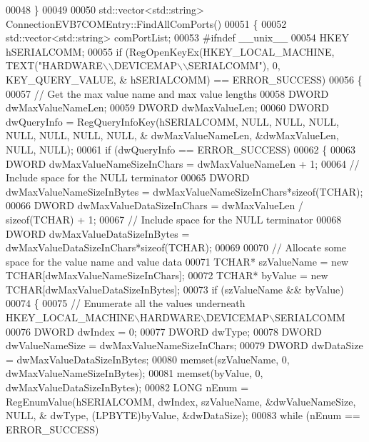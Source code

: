 \begin{DoxyCode}
00048 \}
00049 
00050 std::vector<std::string> ConnectionEVB7COMEntry::FindAllComPorts()
00051 \{
00052     std::vector<std::string> comPortList;
00053 \textcolor{preprocessor}{    #ifndef \_\_unix\_\_}
00054     HKEY hSERIALCOMM;
00055     \textcolor{keywordflow}{if} (RegOpenKeyEx(HKEY\_LOCAL\_MACHINE, TEXT(\textcolor{stringliteral}{"HARDWARE\(\backslash\)\(\backslash\)DEVICEMAP\(\backslash\)\(\backslash\)SERIALCOMM"}),   0, KEY\_QUERY\_VALUE, &
      hSERIALCOMM) == ERROR\_SUCCESS)
00056     \{
00057         \textcolor{comment}{// Get the max value name and max value lengths}
00058         DWORD dwMaxValueNameLen;
00059         DWORD dwMaxValueLen;
00060         DWORD dwQueryInfo = RegQueryInfoKey(hSERIALCOMM, NULL, NULL, NULL, NULL, NULL, NULL, NULL, &
      dwMaxValueNameLen, &dwMaxValueLen, NULL, NULL);
00061         \textcolor{keywordflow}{if} (dwQueryInfo == ERROR\_SUCCESS)
00062         \{
00063             DWORD dwMaxValueNameSizeInChars = dwMaxValueNameLen + 1;
00064             \textcolor{comment}{// Include space for the NULL terminator}
00065             DWORD dwMaxValueNameSizeInBytes = dwMaxValueNameSizeInChars*\textcolor{keyword}{sizeof}(TCHAR);
00066             DWORD dwMaxValueDataSizeInChars = dwMaxValueLen / \textcolor{keyword}{sizeof}(TCHAR) + 1;
00067             \textcolor{comment}{// Include space for the NULL terminator}
00068             DWORD dwMaxValueDataSizeInBytes = dwMaxValueDataSizeInChars*\textcolor{keyword}{sizeof}(TCHAR);
00069 
00070             \textcolor{comment}{// Allocate some space for the value name and value data}
00071             TCHAR* szValueName = \textcolor{keyword}{new} TCHAR[dwMaxValueNameSizeInChars];
00072             TCHAR* byValue = \textcolor{keyword}{new} TCHAR[dwMaxValueDataSizeInBytes];
00073             \textcolor{keywordflow}{if} (szValueName && byValue)
00074             \{
00075                 \textcolor{comment}{// Enumerate all the values underneath HKEY\_LOCAL\_MACHINE\(\backslash\)HARDWARE\(\backslash\)DEVICEMAP\(\backslash\)SERIALCOMM}
00076                 DWORD dwIndex = 0;
00077                 DWORD dwType;
00078                 DWORD dwValueNameSize = dwMaxValueNameSizeInChars;
00079                 DWORD dwDataSize = dwMaxValueDataSizeInBytes;
00080                 memset(szValueName, 0, dwMaxValueNameSizeInBytes);
00081                 memset(byValue, 0, dwMaxValueDataSizeInBytes);
00082                 LONG nEnum = RegEnumValue(hSERIALCOMM, dwIndex, szValueName, &dwValueNameSize, NULL, &
      dwType, (LPBYTE)byValue, &dwDataSize);
00083                 \textcolor{keywordflow}{while} (nEnum == ERROR\_SUCCESS)

\end{DoxyCode}
